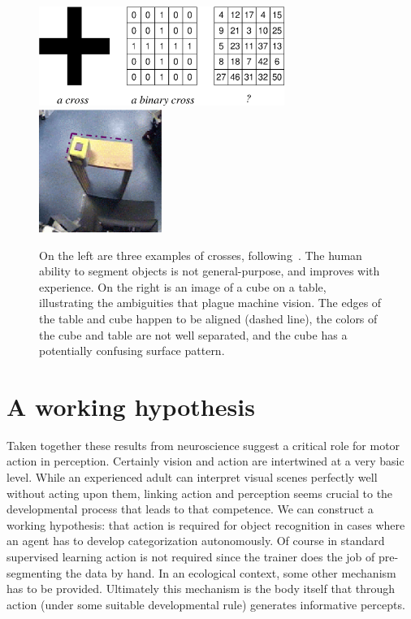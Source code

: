 %
\begin{figure}[tb]
\begin{center}
\includegraphics[width=8.0cm]{number-cross.eps}
\hspace{2cm}
\includegraphics[width=4cm]{setup-sequence.eps}
\caption{ 
\label{fig:number-cross}
%
On the left are three examples of crosses,
following~\cite{manzotti01coscienza}.  The human ability to segment
objects is not general-purpose, and improves with experience.
On the right is an image of a cube on a table, illustrating the
ambiguities that plague machine vision. 
The edges of the table and cube happen to be
aligned (dashed line), the colors of the cube and table are not well
separated, and the cube has a potentially confusing surface pattern.
%
}
\end{center}
\end{figure}
%
%

\fi



%
%
%







\section{A working hypothesis}


Taken together these results from neuroscience suggest a critical role
for motor action in perception. Certainly vision and action are
intertwined at a very basic level.  While an
experienced adult can interpret visual scenes perfectly well without
acting upon them, linking action and perception seems crucial to the
developmental process that leads to that competence.  We can construct
a working hypothesis: that action is required for object recognition in
cases where an agent has to develop categorization autonomously. 
Of course in standard supervised learning action is not required since
the trainer does the job of pre-segmenting the data by hand.  In an
ecological context, some other mechanism has to be provided.
Ultimately this mechanism is the body itself that through action
(under some suitable developmental rule) generates informative
percepts.

